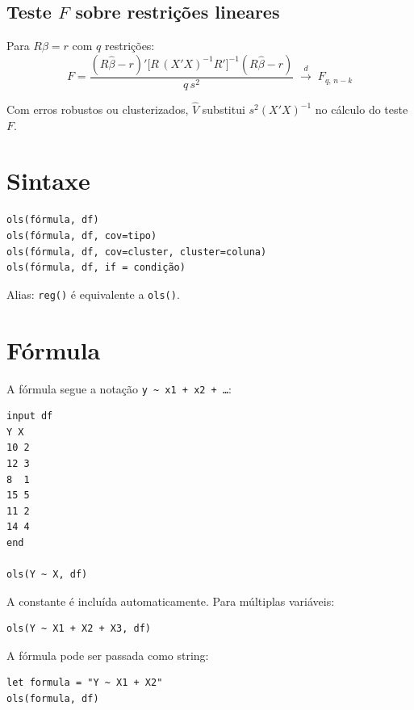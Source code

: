 \subsection*{Teste $F$ sobre restrições lineares}

Para $R\beta = r$ com $q$ restrições:
\[
  F = \frac{(R\hat{\beta} - r)'
       \bigl[R\,(X'X)^{-1}R'\bigr]^{-1}
       (R\hat{\beta} - r)}{q\,s^2}
  \;\xrightarrow{d}\; F_{q,\,n-k}
\]

\begin{nota}
  Com erros robustos ou clusterizados, $\hat{V}$ substitui $s^2(X'X)^{-1}$
  no cálculo do teste $F$.
\end{nota}

\section{Sintaxe}

\begin{lstlisting}
ols(fórmula, df)
ols(fórmula, df, cov=tipo)
ols(fórmula, df, cov=cluster, cluster=coluna)
ols(fórmula, df, if = condição)
\end{lstlisting}

Alias: \lstinline{reg()} é equivalente a \lstinline{ols()}.

\section{Fórmula}
\label{sec:ols-formula}

A fórmula segue a notação \texttt{y \textasciitilde{} x1 + x2 + \ldots}:

\begin{lstlisting}[caption={OLS básico}]
input df
Y X
10 2
12 3
8  1
15 5
11 2
14 4
end

ols(Y ~ X, df)
\end{lstlisting}

A constante é incluída automaticamente. Para múltiplas variáveis:

\begin{lstlisting}
ols(Y ~ X1 + X2 + X3, df)
\end{lstlisting}

A fórmula pode ser passada como string:

\begin{lstlisting}
let formula = "Y ~ X1 + X2"
ols(formula, df)
\end{lstlisting}

